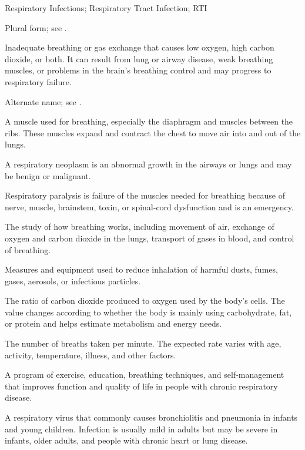 \synonyms
Respiratory Infections; Respiratory Tract Infection; RTI

 Plural form; see .

 Inadequate breathing or gas exchange that causes low oxygen, high carbon dioxide, or both. It can result from lung or airway disease, weak breathing muscles, or problems in the brain’s breathing control and may progress to respiratory failure.

 Alternate name; see .

 A muscle used for breathing, especially the diaphragm and muscles between the ribs. These muscles expand and contract the chest to move air into and out of the lungs.

 A respiratory neoplasm is an abnormal growth in the airways or lungs and may be benign or malignant.

 Respiratory paralysis is failure of the muscles needed for breathing because of nerve, muscle, brainstem, toxin, or spinal-cord dysfunction and is an emergency.

 The study of how breathing works, including movement of air, exchange of oxygen and carbon dioxide in the lungs, transport of gases in blood, and control of breathing.

 Measures and equipment used to reduce inhalation of harmful dusts, fumes, gases, aerosols, or infectious particles.

 The ratio of carbon dioxide produced to oxygen used by the body’s cells. The value changes according to whether the body is mainly using carbohydrate, fat, or protein and helps estimate metabolism and energy needs.

 The number of breaths taken per minute. The expected rate varies with age, activity, temperature, illness, and other factors.

 A program of exercise, education, breathing techniques, and self-management that improves
function and quality of life in people with chronic respiratory disease.

 A respiratory virus that commonly causes bronchiolitis and pneumonia in infants
and young children. Infection is usually mild in adults but may be severe in infants, older adults, and people with
chronic heart or lung disease.

